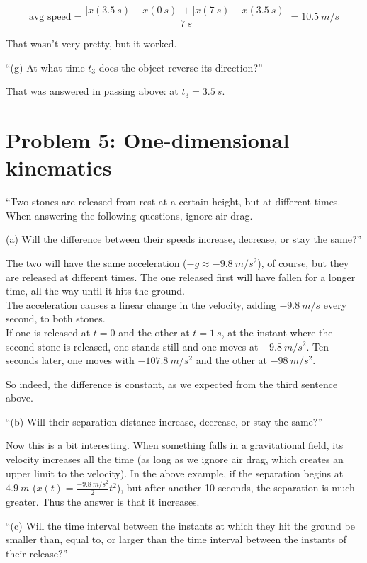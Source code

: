 \documentclass[12pt,a4paper]{report}
\begin{document}
\begin{equation}
\text{avg speed} = \frac{|x(\SI{3.5}{s}) - x(\SI{0}{s})| + |x(\SI{7}{s}) - x(\SI{3.5}{s})|}{\SI{7}{s}} = \SI{10.5}{m/s}
\end{equation}

That wasn't very pretty, but it worked.

``(g) At what time $t_3$ does the object reverse its direction?''

That was answered in passing above: at $t_3 = \SI{3.5}{s}$.

\section{Problem 5: One-dimensional kinematics}

``Two stones are released from rest at a certain height, but at different times. When answering the following questions, ignore air drag.

(a) Will the difference between their speeds increase, decrease, or stay the same?''

The two will have the same acceleration ($-g \approx \SI{-9.8}{m/s^2}$), of course, but they are released at different times. The one released first will have fallen for a longer time, all the way until it hits the ground.\\
The acceleration causes a linear change in the velocity, adding $\SI{-9.8}{m/s}$ every second, to both stones.\\
If one is released at $t=0$ and the other at $t = \SI{1}{s}$, at the instant where the second stone is released, one stands still and one moves at $\SI{-9.8}{m/s^2}$. Ten seconds later, one moves with $\SI{-107.8}{m/s^2}$ and the other at $\SI{-98}{m/s^2}$.

So indeed, the difference is constant, as we expected from the third sentence above.

``(b) Will their separation distance increase, decrease, or stay the same?''

Now this is a bit interesting. When something falls in a gravitational field, its velocity increases all the time (as long as we ignore air drag, which creates an upper limit to the velocity). In the above example, if the separation begins at $\SI{4.9}{m}$ ($\displaystyle x(t) = \frac{\SI{-9.8}{m/s^2}}{2} t^2$), but after another 10 seconds, the separation is much greater. Thus the answer is that it increases.

``(c) Will the time interval between the instants at which they hit the ground be smaller than, equal to, or larger than the time interval between the instants of their release?''
\end{document}
